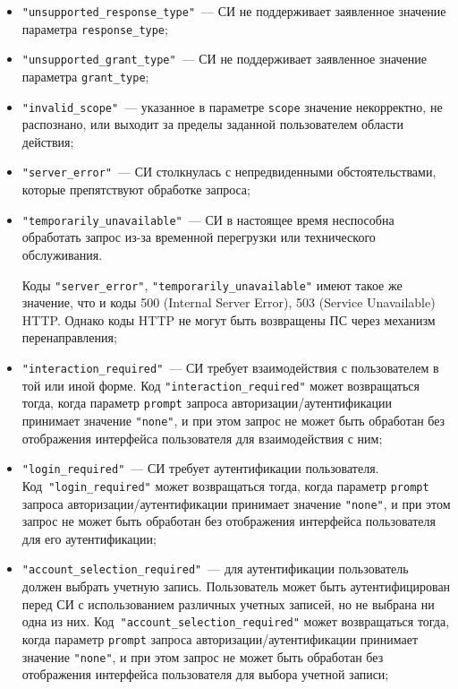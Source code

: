 \begin{itemize}
\item
\lstinline{"unsupported_response_type"}~---
СИ не поддерживает заявленное значение параметра \lstinline{response_type}; 

\item
\lstinline{"unsupported_grant_type"}~---
СИ не поддерживает заявленное значение параметра \lstinline{grant_type};

\item
\lstinline{"invalid_scope"}~---
указанное в параметре \lstinline{scope} значение некорректно, не распознано, 
или выходит за пределы заданной пользователем области действия;

\item
\lstinline{"server_error"}~---
СИ столкнулась с непредвиденными обстоятельствами, 
которые препятствуют обработке запроса;

\item
\lstinline{"temporarily_unavailable"}~---
СИ в настоящее время неспособна обработать запрос из-за временной перегрузки 
или технического обслуживания.

\begin{note*}
Коды \lstinline{"server_error"}, \lstinline{"temporarily_unavailable"} 
имеют такое же значение, что и коды 500 (Internal Server Error), 
503 (Service Unavailable) HTTP. Однако коды HTTP не могут быть возвращены  
ПС через механизм перенаправления;
\end{note*}

\item
\lstinline{"interaction_required"}~---
СИ требует взаимодействия с пользователем в той или иной форме. 
%
Код \lstinline{"interaction_required"} может возвращаться тогда, когда параметр 
\lstinline{prompt} запроса авторизации/аутентификации принимает значение 
\lstinline{"none"}, и при этом запрос не может быть обработан без отображения 
интерфейса пользователя для взаимодействия с ним; 

\item
\lstinline{"login_required"}~---
СИ требует аутентификации пользователя.
%
Код~\lstinline{"login_required"} может возвращаться тогда,
когда параметр \lstinline{prompt} запроса авторизации/аутентификации 
принимает значение \lstinline{"none"}, и при этом запрос не может быть 
обработан без отображения интерфейса пользователя для его аутентификации; 

\item
\lstinline{"account_selection_required"}~--- 
для аутентификации пользователь должен выбрать учетную запись. 
%
Пользователь может быть аутентифицирован перед СИ с использованием различных 
учетных записей, но не выбрана ни одна из них.
%
Код~\lstinline{"account_selection_required"} может возвращаться тогда, когда 
параметр \lstinline{prompt} запроса авторизации/аутентификации 
принимает значение \lstinline{"none"}, и при этом запрос не может быть 
обработан без отображения интерфейса пользователя для выбора учетной записи;


\end{itemize}
